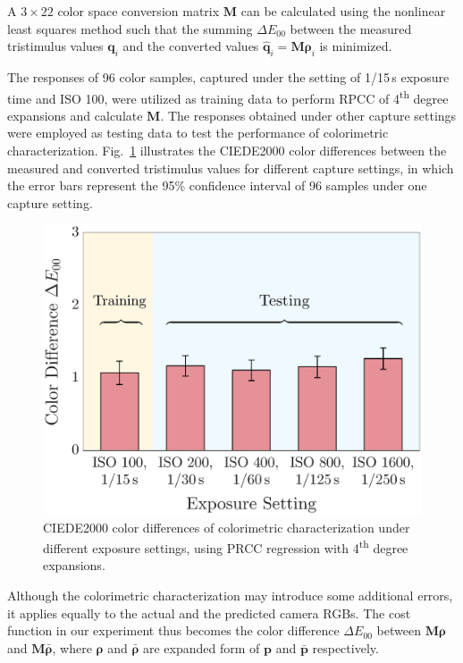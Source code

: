 \documentclass[9pt,twocolumn,twoside]{osajnl}
\begin{document}
A $3\times22$ color space conversion matrix $\mathbf{M}$ can be calculated using the nonlinear least squares method such that the summing $\Delta{}E_{00}$ between the measured tristimulus values $\mathbf{q}_i$ and the converted values $\hat{\mathbf{q}}_i = \mathbf{M}\boldsymbol{\rho}_i$ is minimized.

The responses of 96 color samples, captured under the setting of 1/15\,s exposure time and ISO 100, were utilized as training data to perform RPCC of 4\textsuperscript{th} degree expansions and calculate $\mathbf{M}$. The responses obtained under other capture settings were employed as testing data to test the performance of colorimetric characterization. Fig.~\ref{fig:5} illustrates the CIEDE2000 color differences between the measured and converted tristimulus values for different capture settings, in which the error bars represent the 95\% confidence interval of 96 samples under one capture setting.

\begin{figure}[tbp]
	\centering
	\includegraphics[width=.75\linewidth]{Fig5}
	\caption{CIEDE2000 color differences of colorimetric characterization under different exposure settings, using PRCC regression with 4\textsuperscript{th} degree expansions.}
	\label{fig:5}
\end{figure}

Although the colorimetric characterization may introduce some additional errors, it applies equally to the actual and the predicted camera RGBs. The cost function in our experiment thus becomes the color difference $\Delta{}E_{00}$ between $\mathbf{M}\boldsymbol{\rho}$ and $\mathbf{M}\bar{\boldsymbol{\rho}}$, where $\boldsymbol{\rho}$ and $\bar{\boldsymbol{\rho}}$ are expanded form of $\mathbf{p}$ and $\bar{\mathbf{p}}$ respectively.
\end{document}
